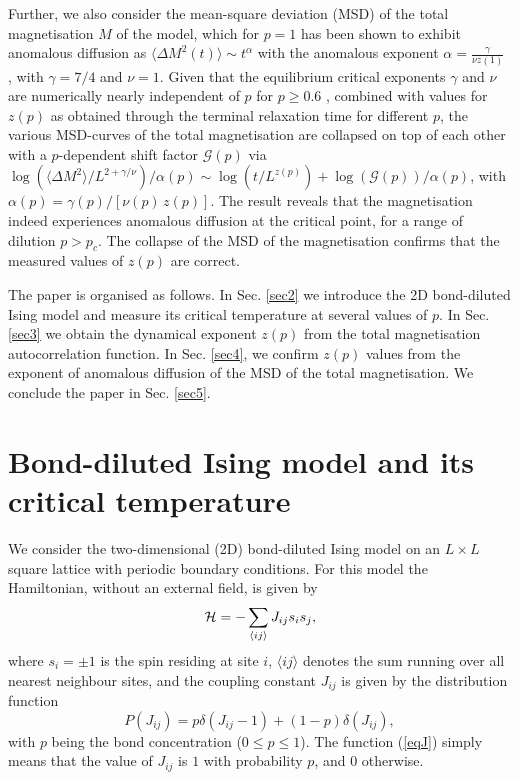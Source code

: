 \documentclass[12pt,nofootinbib,aps,amsmath,amssymb,preprint,showpacs]{revtex4}
\begin{document}
Further, we also consider the mean-square deviation (MSD) of the total
magnetisation $M$ of the model, which for $p=1$ has been shown to
exhibit anomalous diffusion as $\langle\Delta M^2(t)\rangle\sim
t^\alpha$ with the anomalous exponent
$\alpha=\displaystyle{\frac{\gamma}{\nu z(1)}}$ \cite{zhong1}, with
$\gamma=7/4$ and $\nu=1$. Given that the equilibrium critical
exponents $\gamma$ and $\nu$ are numerically nearly independent of $p$
for $p\geq 0.6$ \cite{hadji}, combined with values for $z(p)$ as
obtained through the terminal relaxation time for different $p$, the
various MSD-curves of the total magnetisation are collapsed on top of
each other with a $p$-dependent shift factor $\mathcal{G}(p)$ via
$\log\left( \langle \Delta M^2\rangle /
L^{2+\gamma/\nu}\right)/\alpha(p) \sim \log\left(
t/L^{z(p)}\right)+\log\left( \mathcal{G}(p)\right)/\alpha(p)$, with
$\alpha(p)=\gamma(p)/[\nu(p)\, z(p)]$. The result reveals that the
magnetisation indeed experiences anomalous diffusion at the critical
point, for a range of dilution $p>p_c$.  The collapse of the MSD of
the magnetisation confirms that the measured values of $z(p)$ are
correct.

The paper is organised as follows. In Sec. \ref{sec2} we introduce the
2D bond-diluted Ising model and measure its critical temperature at
several values of $p$. In Sec. \ref{sec3} we obtain the dynamical
exponent $z(p)$ from the total magnetisation autocorrelation
function. In Sec. \ref{sec4}, we confirm $z(p)$ values from the
exponent of anomalous diffusion of the MSD of the total
magnetisation. We conclude the paper in Sec.  \ref{sec5}.

\section{Bond-diluted Ising model and its critical temperature\label{sec2}}

We consider the two-dimensional (2D) bond-diluted Ising model on an
$L\times L$ square lattice with periodic boundary conditions. For this
model the Hamiltonian, without an external field, is given by
\begin{equation}
{\cal H}=-\sum_{\langle ij \rangle} J_{ij}s_i s_j,
\end{equation}
where $s_i=\pm 1$ is the spin residing at site $i$, $\langle ij \rangle$
denotes the sum running over all nearest neighbour sites, and the coupling
constant $J_{ij}$ is given by the distribution function
\begin{equation}
P(J_{ij})=p \delta(J_{ij}-1)+(1-p)\delta(J_{ij}),
\label{eqJ}
\end{equation}
with $p$ being the bond concentration ($0\le p\le1$). The function
(\ref{eqJ}) simply means that the value of $J_{ij}$ is $1$ with probability
$p$, and $0$ otherwise.
\end{document}
